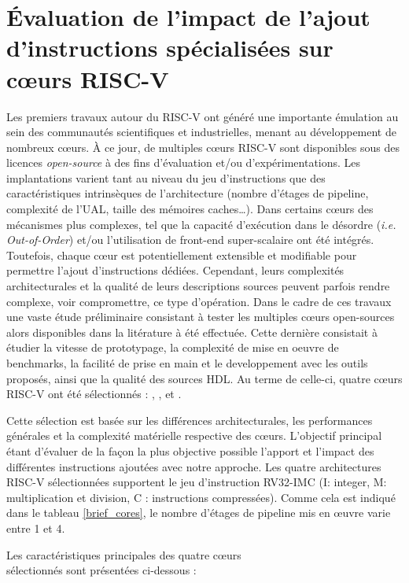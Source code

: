 \documentclass[../main.tex]{subfiles}
\begin{document}
\section{Évaluation de l'impact de l'ajout d'instructions spécialisées sur cœurs RISC-V}
\label{impact_coeur}
%
%
%
%
Les premiers travaux autour du RISC-V ont généré une importante émulation au sein des communautés scientifiques et industrielles, menant au développement de nombreux cœurs. 
À ce jour, de multiples cœurs RISC-V sont disponibles sous des licences \textit{open-source} à des fins d’évaluation et/ou d’expérimentations. 
Les implantations varient tant au niveau du jeu d'instructions que des caractéristiques intrinsèques de l'architecture (nombre d’étages de pipeline, complexité de l’UAL, taille des mémoires caches\ldots). 
Dans certains cœurs des mécanismes plus complexes, tel que la capacité d’exécution dans le désordre (\textit{i.e. Out-of-Order}) et/ou l'utilisation de front-end super-scalaire ont été intégrés.  Toutefois, chaque cœur est potentiellement extensible et modifiable pour permettre l'ajout d'instructions dédiées. Cependant, leurs complexités architecturales et la qualité de leurs descriptions sources peuvent parfois rendre complexe, voir compromettre, ce type d'opération. 
Dans le cadre de ces travaux une vaste étude préliminaire consistant à tester les multiples cœurs open-sources alors disponibles dans la litérature à été effectuée. Cette dernière consistait à étudier la vitesse de prototypage, la complexité de mise en oeuvre de benchmarks, la facilité de prise en main et le developpement avec les outils proposés, ainsi que la qualité des sources HDL. Au terme de celle-ci, quatre cœurs RISC-V ont été sélectionnés : \PicoRV \cite{wolf_cliffordwolfpicorv32_2021}, \RISCY \cite{cite_riscy}, \IBEX \cite{noauthor_lowriscibex_2021,schiavone_slow_2017} et \SCR \cite{noauthor_syntacorescr1_2021}.

Cette sélection est basée sur les différences architecturales, les performances générales et la complexité matérielle respective des cœurs. L'objectif principal étant d’évaluer de la façon la plus objective possible l'apport et l'impact des différentes instructions ajoutées avec notre approche. 
Les quatre architectures RISC-V sélectionnées supportent le jeu d'instruction RV32-IMC (I: integer, M: multiplication et division, C : instructions compressées). Comme cela est indiqué dans le tableau \ref{brief_cores}, le nombre d'étages de pipeline mis en œuvre varie entre 1 et 4.

Les caractéristiques principales des quatre cœurs \\
sélectionnés sont présentées ci-dessous : 
\end{document}
